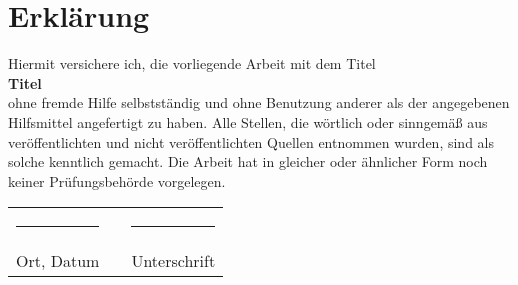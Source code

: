 \clearpage
\chapter*{Erklärung}\label{erklaerung}
\thispagestyle{empty}

Hiermit versichere ich, die vorliegende Arbeit mit dem Titel \vspace{0.5cm}\\\vspace{0.5cm}
\textbf{Titel}\\
ohne fremde Hilfe selbstständig und ohne Benutzung anderer als der angegebenen Hilfsmittel angefertigt zu haben. Alle Stellen, die wörtlich oder sinngemäß aus veröffentlichten und nicht veröffentlichten Quellen entnommen wurden, sind als solche kenntlich gemacht. Die Arbeit hat in gleicher oder ähnlicher Form noch keiner Prüfungsbehörde vorgelegen.

     
\vspace{1cm}

\begin{tabularx}{\textwidth}{lXl}
  \rule{5cm}{0.4pt} & & \rule{5cm}{0.4pt}\\
  Ort, Datum & & Unterschrift
\end{tabularx}
